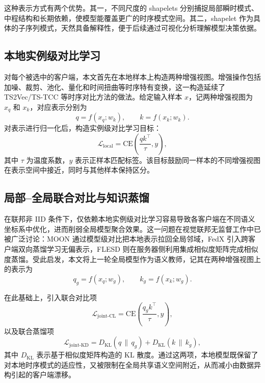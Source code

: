 \documentclass{article}
\begin{document}
这种表示方式有两个优势。其一，不同尺度的 shapelets 分别捕捉局部瞬时模式、中程结构和长期依赖，使模型能覆盖更广的时序模式空间。其二，shapelet 作为具体的子序列模式，天然具备解释性，便于后续通过可视化分析理解模型决策依据。

\subsection{本地实例级对比学习}

对每个被选中的客户端，本文首先在本地样本上构造两种增强视图。增强操作包括加噪、裁剪、池化、量化和时间扭曲等时序特有变换，这一构造延续了 TS2Vec/TS-TCC 等时序对比方法的做法\cite{ts2vec,tstcc}。给定输入样本 $x$，记两种增强视图为 $x_q$ 和 $x_k$，对应表示分别为
\begin{equation}
q = f(x_q;w_k),\qquad k = f(x_k;w_k).
\end{equation}
对表示进行归一化后，构造实例级对比学习目标：
\begin{equation}
\mathcal{L}_{\text{local}} = \mathrm{CE}\left(\frac{qk^\top}{\tau}, y\right),
\end{equation}
其中 $\tau$ 为温度系数，$y$ 表示正样本匹配标签。该目标鼓励同一样本的不同增强视图在表示空间中接近，同时与其他样本保持区分。

\subsection{局部--全局联合对比与知识蒸馏}

在联邦非 IID 条件下，仅依赖本地实例级对比学习容易导致各客户端在不同语义坐标系中优化，进而削弱全局模型聚合效果\cite{fedu2}。这一问题在视觉联邦无监督工作中已被广泛讨论：MOON 通过模型级对比把本地表示拉回全局邻域\cite{moon}，FedX 引入跨客户端双向蒸馏学习无偏表示\cite{fedx}，FLESD 则在服务器侧利用集成相似度矩阵完成相似度蒸馏\cite{flesd}。受此启发，本文将上一轮全局模型作为语义教师，记其在两种增强视图上的表示为
\begin{equation}
q_g = f(x_q; w_g),\qquad k_g = f(x_k; w_g).
\end{equation}

在此基础上，引入联合对比项
\begin{equation}
\mathcal{L}_{\text{joint-CL}} = \mathrm{CE}\left(\frac{q_gk^\top}{\tau}, y\right),
\end{equation}
以及联合蒸馏项
\begin{equation}
\mathcal{L}_{\text{joint-KD}} = D_{\mathrm{KL}}(q \,\|\, q_g) + D_{\mathrm{KL}}(k \,\|\, k_g),
\end{equation}
其中 $D_{\mathrm{KL}}$ 表示基于相似度矩阵构造的 KL 散度。通过这两项，本地模型既保留了对本地时序模式的适应性，又被限制在全局共享语义空间附近，从而减小由数据异构引起的客户端漂移。
\end{document}
